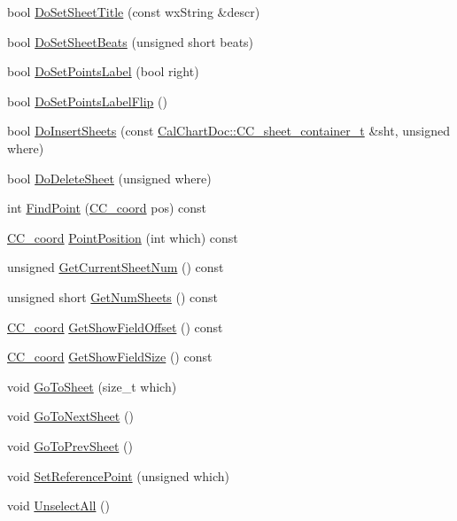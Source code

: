 \begin{DoxyCompactItemize}
\item 
bool \hyperlink{a00103_a90cfb951d00ddaa854dc33c0983301f1}{Do\-Set\-Sheet\-Title} (const wx\-String \&descr)
\item 
bool \hyperlink{a00103_a982f269fac5fac9138dcf926937514b4}{Do\-Set\-Sheet\-Beats} (unsigned short beats)
\item 
bool \hyperlink{a00103_ad90d0977d741729e1f09bd87dadba328}{Do\-Set\-Points\-Label} (bool right)
\item 
bool \hyperlink{a00103_a0922ee010cf53c5d08812fa1cf2f3b28}{Do\-Set\-Points\-Label\-Flip} ()
\item 
bool \hyperlink{a00103_a827f3a3394d7945a879af12b11e738a9}{Do\-Insert\-Sheets} (const \hyperlink{a00020_ab378b0e2a08984cfda6487b5161e520c}{Cal\-Chart\-Doc\-::\-C\-C\-\_\-sheet\-\_\-container\-\_\-t} \&sht, unsigned where)
\item 
bool \hyperlink{a00103_ad55b1241d75f9c501bc66bb68ec68ca3}{Do\-Delete\-Sheet} (unsigned where)
\item 
int \hyperlink{a00103_a4f3938045b7d5f73c26315de1569e63f}{Find\-Point} (\hyperlink{a00029}{C\-C\-\_\-coord} pos) const 
\item 
\hyperlink{a00029}{C\-C\-\_\-coord} \hyperlink{a00103_a7747532112ac3c7772114dd17f053547}{Point\-Position} (int which) const 
\item 
unsigned \hyperlink{a00103_a9bafe465a3b112a819a7e444c21be886}{Get\-Current\-Sheet\-Num} () const 
\item 
unsigned short \hyperlink{a00103_a867b39d62958c0321f146185a7952e97}{Get\-Num\-Sheets} () const 
\item 
\hyperlink{a00029}{C\-C\-\_\-coord} \hyperlink{a00103_a6692c375ef700b67b19a14bb02c8e806}{Get\-Show\-Field\-Offset} () const 
\item 
\hyperlink{a00029}{C\-C\-\_\-coord} \hyperlink{a00103_a0039c2228467eaf44e256667893ce30d}{Get\-Show\-Field\-Size} () const 
\item 
void \hyperlink{a00103_ac5997e3f9ec98257bbd644302412c7fe}{Go\-To\-Sheet} (size\-\_\-t which)
\item 
void \hyperlink{a00103_adf58eb0900375b419a47105d0cf21a1b}{Go\-To\-Next\-Sheet} ()
\item 
void \hyperlink{a00103_aa6bcf776d318009746c9291c84d594e9}{Go\-To\-Prev\-Sheet} ()
\item 
void \hyperlink{a00103_af8bb49417d598bb673caaa1c999c8539}{Set\-Reference\-Point} (unsigned which)
\item 
void \hyperlink{a00103_a1e25ad61a0da6112c41a5d8945a2c538}{Unselect\-All} ()

\end{DoxyCompactItemize}

